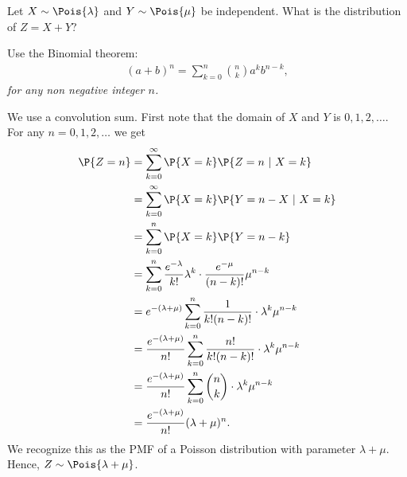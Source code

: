 \begin{exercise}
Let $X \sim \Pois{\lambda}$ and $Y \sim \Pois{\mu}$ be independent. What is the distribution of $Z = X + Y$?\\
\begin{hint}
Use the Binomial theorem:
\begin{align}
    (a + b)^n = \sum_{k=0}^n {n \choose k}a^k b^{n-k},
\end{align}
\textit{for any non negative integer $n$.}
\end{hint}

\begin{solution}
We use a convolution sum. First note that the domain of $X$ and $Y$ is $0,1,2,\ldots$. For any $n=0,1,2,\ldots$ we get
\begin{align}
    \P{Z = n} &= \sum_{k=0}^\infty \P{X = k} \P{Z = n \ | \ X = k} \\
    &= \sum_{k=0}^\infty \P{X = k} \P{Y = n - X \ | \ X = k} \\
    &= \sum_{k=0}^n \P{X = k} \P{Y = n - k} \\
    &= \sum_{k=0}^n \frac{e^{-\lambda}}{k!}\lambda^k  \cdot \frac{e^{-\mu}}{(n-k)!}\mu^{n-k}  \\
    &= e^{-(\lambda+\mu)} \sum_{k=0}^n \frac{1}{k!(n-k)!} \cdot \lambda^k\mu^{n-k}  \\
    &= \frac{e^{-(\lambda+\mu)}}{n!} \sum_{k=0}^n \frac{n!}{k!(n-k)!} \cdot \lambda^k\mu^{n-k}  \\
    &= \frac{e^{-(\lambda+\mu)}}{n!} \sum_{k=0}^n {n \choose k} \cdot \lambda^k\mu^{n-k}  \\
    &= \frac{e^{-(\lambda+\mu)}}{n!} (\lambda + \mu)^n.
\end{align}
We recognize this as the PMF of a Poisson distribution with parameter $\lambda+\mu$. Hence, $Z \sim \Pois{\lambda + \mu}$.
\end{solution}
\end{exercise}

